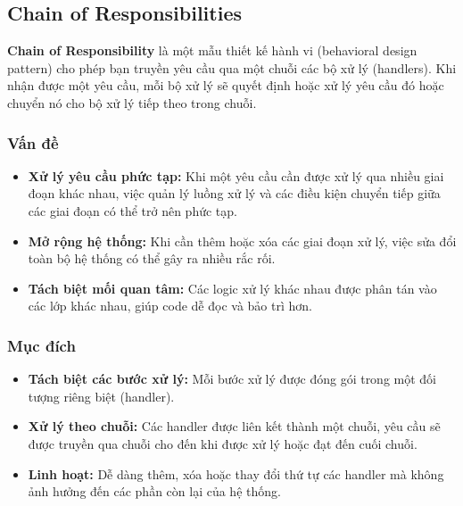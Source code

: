 \subsection{Chain of Responsibilities}
\begin{flushleft}
	\textbf{Chain of Responsibility} là một mẫu thiết kế hành vi (behavioral design pattern) cho phép bạn truyền yêu cầu qua một chuỗi các bộ xử lý (handlers). Khi nhận được một yêu cầu, mỗi bộ xử lý sẽ quyết định hoặc xử lý yêu cầu đó hoặc chuyển nó cho bộ xử lý tiếp theo trong chuỗi.
\end{flushleft}

\subsubsection{Vấn đề}
\begin{flushleft}
	\begin{itemize}
		\item \textbf{Xử lý yêu cầu phức tạp:} Khi một yêu cầu cần được xử lý qua nhiều giai đoạn khác nhau, việc quản lý luồng xử lý và các điều kiện chuyển tiếp giữa các giai đoạn có thể trở nên phức tạp.
		\item \textbf{Mở rộng hệ thống:} Khi cần thêm hoặc xóa các giai đoạn xử lý, việc sửa đổi toàn bộ hệ thống có thể gây ra nhiều rắc rối.
		\item \textbf{Tách biệt mối quan tâm:} Các logic xử lý khác nhau được phân tán vào các lớp khác nhau, giúp code dễ đọc và bảo trì hơn.
	\end{itemize}
\end{flushleft}

\subsubsection{Mục đích}
\begin{flushleft}
	\begin{itemize}
		\item \textbf{Tách biệt các bước xử lý:} Mỗi bước xử lý được đóng gói trong một đối tượng riêng biệt (handler).
		\item \textbf{Xử lý theo chuỗi:} Các handler được liên kết thành một chuỗi, yêu cầu sẽ được truyền qua chuỗi cho đến khi được xử lý hoặc đạt đến cuối chuỗi.
		\item \textbf{Linh hoạt:} Dễ dàng thêm, xóa hoặc thay đổi thứ tự các handler mà không ảnh hưởng đến các phần còn lại của hệ thống.
	\end{itemize}
\end{flushleft}

